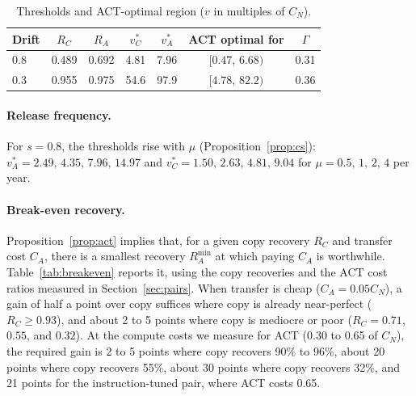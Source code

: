 \documentclass[ijoc,nonblindrev]{informs4}
\begin{document}
\begin{table}[t]
\centering
\caption{Thresholds and ACT-optimal region ($v$ in multiples of $C_N$).}\label{tab:policy}
\begin{tabular}{lcccccc}
\toprule
Drift & $R_C$ & $R_A$ & $v^*_C$ & $v^*_A$ & ACT optimal for & $\Gamma$\\
\midrule
0.8 & 0.489 & 0.692 & 4.81 & 7.96 & $[0.47,\,6.68)$ & 0.31\\
0.3 & 0.955 & 0.975 & 54.6 & 97.9 & $[4.78,\,82.2)$ & 0.36\\
\bottomrule
\end{tabular}
\end{table}

\paragraph{Release frequency.} For $s=0.8$, the thresholds rise with $\mu$ (Proposition~\ref{prop:cs}):
$v^*_A=2.49,\,4.35,\,7.96,\,14.97$ and $v^*_C=1.50,\,2.63,\,4.81,\,9.04$ for $\mu=0.5,\,1,\,2,\,4$ per year.

\paragraph{Break-even recovery.} Proposition~\ref{prop:act} implies that, for a given copy recovery $R_C$ and transfer cost
$C_A$, there is a smallest recovery $R_A^{\min}$ at which paying $C_A$ is worthwhile. Table~\ref{tab:breakeven} reports it, using the copy recoveries and
the ACT cost ratios measured in Section~\ref{sec:pairs}. When transfer is cheap ($C_A=0.05C_N$), a gain of half a point over copy suffices where copy is already
near-perfect ($R_C\ge 0.93$), and about 2 to 5 points where copy is mediocre or poor ($R_C=0.71$, $0.55$, and $0.32$). At the compute costs we measure for ACT (0.30 to 0.65 of $C_N$),
the required gain is 2 to 5 points where copy recovers 90\% to 96\%, about 20 points where copy recovers 55\%, about 30 points where copy recovers 32\%, and 21 points for the instruction-tuned pair, where ACT costs 0.65.
\end{document}
